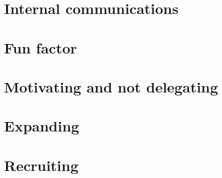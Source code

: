 \section{Internal communications}
\section{Fun factor}
\section{Motivating and not delegating}
\section{Expanding}
\section{Recruiting}